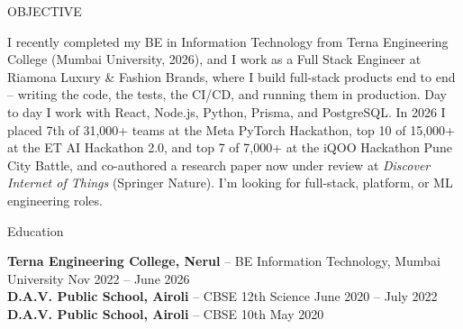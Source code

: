 \documentclass{resume} %
\begin{document}

\begin{rSection}{OBJECTIVE}

{I recently completed my BE in Information Technology from Terna Engineering College (Mumbai University, 2026), and I work as a Full Stack Engineer at Riamona Luxury \& Fashion Brands, where I build full-stack products end to end -- writing the code, the tests, the CI/CD, and running them in production. Day to day I work with React, Node.js, Python, Prisma, and PostgreSQL. In 2026 I placed 7th of 31,000+ teams at the Meta PyTorch Hackathon, top 10 of 15,000+ at the ET AI Hackathon 2.0, and top 7 of 7,000+ at the iQOO Hackathon Pune City Battle, and co-authored a research paper now under review at \textit{Discover Internet of Things} (Springer Nature). I'm looking for full-stack, platform, or ML engineering roles.}

\end{rSection}


\begin{rSection}{Education}

{\bf Terna Engineering College, Nerul} -- BE Information Technology, Mumbai University \hfill {Nov 2022 -- June 2026}\\
{\bf D.A.V. Public School, Airoli} -- CBSE 12th Science \hfill {June 2020 -- July 2022}\\
{\bf D.A.V. Public School, Airoli} -- CBSE 10th \hfill {May 2020}

\end{rSection}

\end{document}
